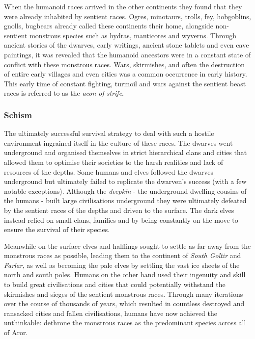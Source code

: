 When the humanoid races arrived in the other continents they found that they
were already inhabited by sentient races. Ogres, minotaurs, trolls, fey,
hobgoblins, gnolls, bugbears already called these continents their home,
alongside non-sentient monstrous species such as hydras, manticores and
wyverns. Through ancient stories of the dwarves, early writings, ancient stone
tablets and even cave paintings, it was revealed that the humanoid ancestors
were in a constant state of conflict with these monstrous races. Wars,
skirmishes, and often the destruction of entire early villages and even cities
was a common occurrence in early history. This early time of constant fighting,
turmoil and wars against the sentient beast races is referred to as the
\emph{aeon of strife}.

\subsubsection{Schism}
\label{sec:Schism}

The ultimately successful survival strategy to deal with such a hostile
environment ingrained itself in the culture of these races. The dwarves went
underground and organised themselves in strict hierarchical clans and cities
that allowed them to optimise their societies to the harsh realities and lack
of resources of the depths. Some humans and elves followed the dwarves
underground but ultimately failed to replicate the dwarven's success (with a
few notable exceptions). Although the \emph{deepkin} - the underground
dwelling cousins of the humans - built large civilisations underground they
were ultimately defeated by the sentient races of the depths and driven to the
surface. The dark elves instead relied on small clans, families and by being
constantly on the move to ensure the survival of their species.

Meanwhile on the surface elves and halflings sought to settle as far away from
the monstrous races as possible, leading them to the continent of \emph{South
Goltir} and \emph{Farlar}, as well as becoming the pale elves by settling the
vast ice sheets of the north and south poles. Humans on the other hand used
their ingenuity and skill to build great civilisations and cities that could
potentially withstand the skirmishes and sieges of the sentient monstrous
races. Through many iterations over the course of thousands of years, which
resulted in countless destroyed and ransacked cities and fallen civilisations,
humans have now achieved the unthinkable: dethrone the monstrous races as the
predominant species across all of Aror.

